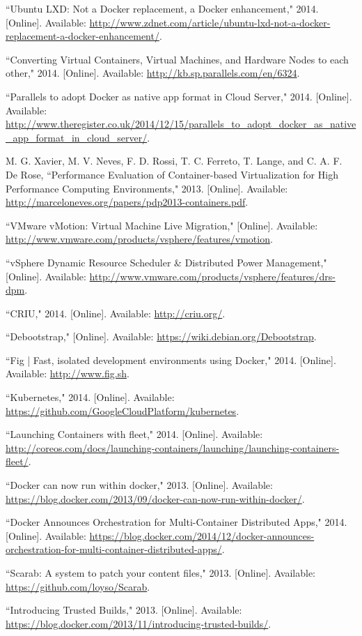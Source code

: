\begin{thebibliography}{99}
\begin{singlespace}
``Ubuntu LXD: Not a Docker replacement, a Docker enhancement," 2014. [Online]. Available: \url{http://www.zdnet.com/article/ubuntu-lxd-not-a-docker-replacement-a-docker-enhancement/}.

``Converting Virtual Containers, Virtual Machines, and Hardware Nodes to each other," 2014. [Online]. Available: \url{http://kb.sp.parallels.com/en/6324}.

``Parallels to adopt Docker as native app format in Cloud Server," 2014. [Online]. Available: \url{http://www.theregister.co.uk/2014/12/15/parallels_to_adopt_docker_as_native_app_format_in_cloud_server/}.

M. G. Xavier, M. V. Neves, F. D. Rossi, T. C. Ferreto, T. Lange, and C. A. F. De Rose, ``Performance Evaluation of Container-based Virtualization for High Performance Computing Environments," 2013. [Online]. Available: \url{http://marceloneves.org/papers/pdp2013-containers.pdf}.

``VMware vMotion: Virtual Machine Live Migration," [Online]. Available: \url{http://www.vmware.com/products/vsphere/features/vmotion}.

``vSphere Dynamic Resource Scheduler \& Distributed Power Management," [Online]. Available: \url{http://www.vmware.com/products/vsphere/features/drs-dpm}.

``CRIU," 2014. [Online]. Available: \url{http://criu.org/}.

``Debootstrap," [Online]. Available: \url{https://wiki.debian.org/Debootstrap}.

``Fig | Fast, isolated development environments using Docker," 2014. [Online]. Available: \url{http://www.fig.sh}.

``Kubernetes," 2014. [Online]. Available: \url{https://github.com/GoogleCloudPlatform/kubernetes}.

``Launching Containers with fleet," 2014. [Online]. Available: \url{http://coreos.com/docs/launching-containers/launching/launching-containers-fleet/}.

``Docker can now run within docker," 2013. [Online]. Available: \url{https://blog.docker.com/2013/09/docker-can-now-run-within-docker/}.

``Docker Announces Orchestration for Multi-Container Distributed Apps," 2014. [Online]. Available: \url{https://blog.docker.com/2014/12/docker-announces-orchestration-for-multi-container-distributed-apps/}.

``Scarab: A system to patch your content files," 2013. [Online]. Available: \url{https://github.com/loyso/Scarab}.

``Introducing Trusted Builds," 2013. [Online]. Available: \url{https://blog.docker.com/2013/11/introducing-trusted-builds/}.

\end{singlespace}
\end{thebibliography}
